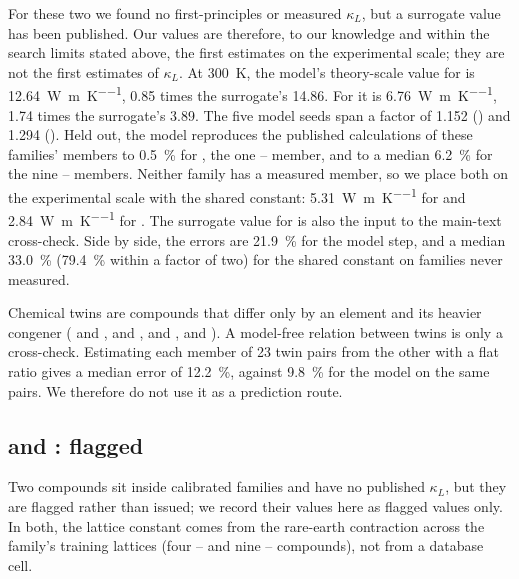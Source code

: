 \documentclass[preprint, 12pt]{elsarticle}
\begin{document}
For these two we found no first-principles or measured $\kappa_L$, but a surrogate value
has been published. Our values are therefore, to our knowledge and within the search limits stated
above, the first estimates on the experimental scale; they are not the first estimates of
$\kappa_L$. At \SI{300}{\kelvin}, the model's theory-scale value for  is
\SI{12.64}{\watt\per\meter\per\kelvin}, \num{0.85} times the surrogate's \num{14.86}. For
 it is \SI{6.76}{\watt\per\meter\per\kelvin}, \num{1.74} times the surrogate's
\num{3.89}. The five model seeds span a factor of \num{1.152} () and \num{1.294}
(). Held out, the model reproduces the published calculations of these families' members
to \SI{0.5}{\percent} for , the one -- member, and to a median
\SI{6.2}{\percent} for the nine -- members. Neither family has a measured member, so we
place both on the experimental scale with the shared constant: \SI{5.31}{\watt\per\meter\per\kelvin}
for  and \SI{2.84}{\watt\per\meter\per\kelvin} for . The surrogate value for
 is also the input to the main-text  cross-check. Side by side, the errors are
\SI{21.9}{\percent} for the model step, and a median \SI{33.0}{\percent} (\SI{79.4}{\percent} within
a factor of two) for the shared constant on families never measured.

Chemical twins are compounds that differ only by an element and its heavier congener ( and
,  and ,  and ,  and ). A model-free relation
between twins is only a cross-check. Estimating each member of \num{23} twin pairs from the
other with a flat ratio gives a median error of \SI{12.2}{\percent}, against \SI{9.8}{\percent} for
the model on the same pairs. We therefore do not use it as a prediction route.

\subsection*{ and : flagged}

Two compounds sit inside calibrated families and have no published $\kappa_L$, but they are flagged
rather than issued; we record their values here as flagged values only. In both, the lattice
constant comes from the rare-earth contraction across the family's training lattices (four
-- and nine -- compounds), not from a database cell.
\end{document}

